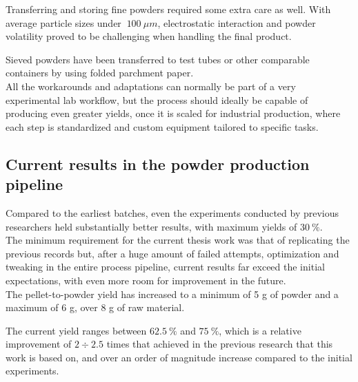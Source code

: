 \documentclass{article}
\begin{document}
        Transferring and storing fine powders required some extra care as well. With average particle sizes under $ \ 100 \ \mu m$, 
        electrostatic interaction and powder volatility proved to be challenging when handling the final product. 
        
        Sieved powders have been transferred to test tubes or other comparable containers by using folded parchment paper. \\ 

        
        All the workarounds and adaptations can normally be part of a very experimental lab workflow, but the process should ideally 
        be capable of producing even greater yields, once it is scaled for industrial production, where each step is standardized 
        and custom equipment tailored to specific tasks. 

        \clearpage

        \subsection{Current results in the powder production pipeline \label{promising_results}}

        Compared to the earliest batches, even the experiments conducted by previous researchers held substantially better 
        results, with maximum yields of $30 \ \%$. \\ 

        The minimum requirement for the current thesis work was that of replicating the previous records but, after 
        a huge amount of failed attempts, optimization and tweaking in the entire process pipeline, current results 
        far exceed the initial expectations, with even more room for improvement in the future. \\ 

        The pellet-to-powder yield has increased to a minimum of 5 g of powder and a maximum of 6 g, over 8 g of raw material. 

        The current yield ranges between $62.5 \ \%$ and $75 \ \%$, which is a relative improvement of $2 \div 2.5$ times that 
        achieved in the previous research that this work is based on, and over an order of magnitude increase compared to the 
        initial experiments. \\ 
%
%
\end{document}
